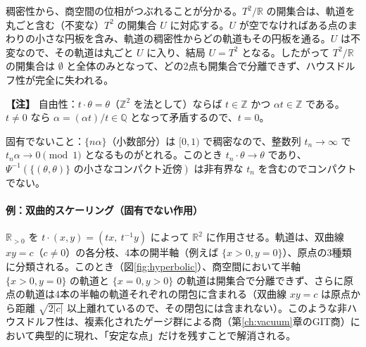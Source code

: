 \documentclass[uplatex, dvipdfmx, book]{jsbook}
\newenvironment{note}{\vspace{1ex}\par\footnotesize\noindent\textbf{【注】}}{\par\vspace{1ex}}
\begin{document}
稠密性から、商空間の位相がつぶれることが分かる。$T^2/\mathbb{R}$ の開集合は、軌道を丸ごと含む（不変な）$T^2$ の開集合 $U$ に対応する。$U$ が空でなければある点のまわりの小さな円板を含み、軌道の稠密性からどの軌道もその円板を通る。$U$ は不変なので、その軌道は丸ごと $U$ に入り、結局 $U = T^2$ となる。したがって $T^2/\mathbb{R}$ の開集合は $\emptyset$ と全体のみとなって、どの2点も開集合で分離できず、ハウスドルフ性が完全に失われる。

\begin{note}
自由性：$t \cdot \theta = \theta$（$\mathbb{Z}^2$ を法として）ならば $t \in \mathbb{Z}$ かつ $\alpha t \in \mathbb{Z}$ である。$t \neq 0$ なら $\alpha = (\alpha t)/t \in \mathbb{Q}$ となって矛盾するので、$t = 0$。

固有でないこと：$\{n\alpha\}$（小数部分）は $[0,1)$ で稠密なので、整数列 $t_n \to \infty$ で $t_n \alpha \to 0 \pmod 1$ となるものがとれる。このとき $t_n \cdot \theta \to \theta$ であり、$\Psi^{-1}(\{(\theta, \theta)\} \text{ の小さなコンパクト近傍})$ は非有界な $t_n$ を含むのでコンパクトでない。
\end{note}

\paragraph{例：双曲的スケーリング（固有でない作用）}
$\mathbb{R}_{>0}$ を $t \cdot (x, y) = (t x,\ t^{-1} y)$ によって $\mathbb{R}^2$ に作用させる。軌道は、双曲線 $xy = c$（$c \neq 0$）の各分枝、4本の開半軸（例えば $\{x > 0, y = 0\}$）、原点の3種類に分類される。このとき（図\ref{fig:hyperbolic}）、商空間において半軸 $\{x > 0, y = 0\}$ の軌道と $\{x = 0, y > 0\}$ の軌道は開集合で分離できず、さらに原点の軌道は4本の半軸の軌道それぞれの閉包に含まれる（双曲線 $xy = c$ は原点から距離 $\sqrt{2|c|}$ 以上離れているので、その閉包には含まれない）。このような非ハウスドルフ性は、複素化されたゲージ群による商（第\ref{ch:vacuum}章のGIT商）において典型的に現れ、「安定な点」だけを残すことで解消される。
\end{document}
